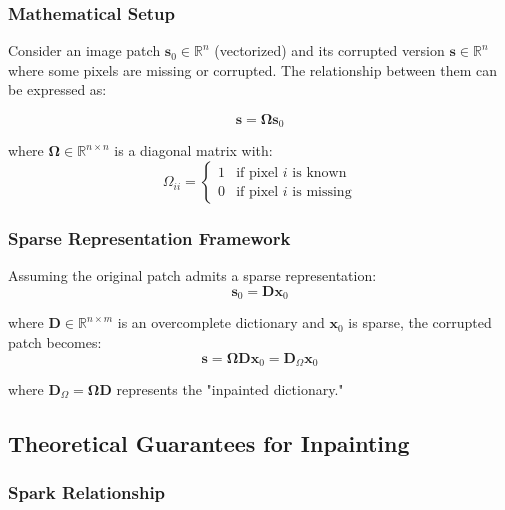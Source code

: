 \documentclass[12pt]{article}
\renewcommand{\vec}[1]{\mathbf{#1}}
\newcommand{\Real}{\mathbb{R}}
\theoremstyle{definition}
\begin{document}
\subsubsection{Mathematical Setup}

Consider an image patch $\vec{s}_0 \in \Real^{n}$ (vectorized) and its corrupted version $\vec{s} \in \Real^{n}$ where some pixels are missing or corrupted. The relationship between them can be expressed as:

\begin{equation}
    \vec{s} = \mathbf{\Omega} \vec{s}_0
\end{equation}

where $\mathbf{\Omega} \in \Real^{n \times n}$ is a diagonal matrix with:
\begin{equation}
    \Omega_{ii} = \begin{cases}
        1 & \text{if pixel } i \text{ is known}   \\
        0 & \text{if pixel } i \text{ is missing}
    \end{cases}
\end{equation}

\subsubsection{Sparse Representation Framework}

Assuming the original patch admits a sparse representation:
\begin{equation}
    \vec{s}_0 = \mathbf{D}\vec{x}_0
\end{equation}

where $\mathbf{D} \in \Real^{n \times m}$ is an overcomplete dictionary and $\vec{x}_0$ is sparse, the corrupted patch becomes:
\begin{equation}
    \vec{s} = \mathbf{\Omega} \mathbf{D} \vec{x}_0 = \mathbf{D}_{\Omega} \vec{x}_0
\end{equation}

where $\mathbf{D}_{\Omega} = \mathbf{\Omega} \mathbf{D}$ represents the "inpainted dictionary."

\subsection{Theoretical Guarantees for Inpainting}

\subsubsection{Spark Relationship}
\end{document}
